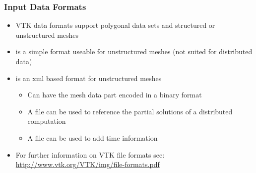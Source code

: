 \begin{frame}

  \frametitle{Input Data Formats}

    \begin{itemize}

      \item VTK data formats support polygonal data sets and structured or unstructured meshes 

      \item {} is a simple format useable for unstructured meshes (not suited for distributed data)  

      \item {} is an xml based format for unstructured meshes   
    \begin{itemize}

      \item Can have the mesh data part encoded in a binary format   

      \item A  file can be used to reference the partial solutions of a distributed computation   

      \item A  file can be used to add time information   

    \end{itemize}

    \item For further information on VTK file formats see:
      \url{http://www.vtk.org/VTK/img/file-formats.pdf}

  \end{itemize}

\end{frame}

